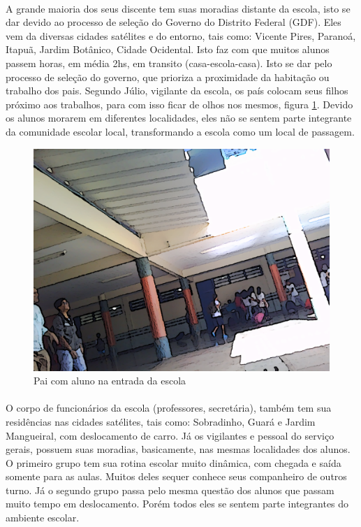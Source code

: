 \paragraph{}A  grande  maioria  dos  seus  discente  tem  suas  moradias  distante  da  escola,  isto  se dar  devido  ao  processo  de  seleção  do  Governo  do  Distrito  Federal  (GDF).  Eles  vem  da diversas  cidades  satélites  e  do  entorno,  tais  como:  Vicente  Pires,  Paranoá,  Itapuã,  Jardim Botânico,  Cidade   Ocidental.   Isto  faz  com  que  muitos  alunos  passem   horas,  em  média   2hs, em  transito  (casa-escola-casa).  Isto  se  dar  pelo  processo  de  seleção  do  governo,  que prioriza  a  proximidade  da  habitação  ou  trabalho  dos  pais.  Segundo  Júlio,  vigilante  da escola,  os  país  colocam  seus  filhos próximo aos trabalhos, para com  isso ficar de olhos nos mesmos, figura \ref{figura06}.  Devido  os  alunos  morarem  em  diferentes  localidades,  eles  não  se sentem  parte  integrante  da  comunidade  escolar  local,  transformando  a  escola  como  um local de passagem.
\begin{figure}[!htpb]
        \centering
        \includegraphics[width=.7\textwidth]{imagens/paiealunoEntrada01.png}
        \caption{Pai com aluno na entrada da escola}
        \label{figura06}
\end{figure}
\paragraph{}O  corpo  de  funcionários  da  escola  (professores,  secretária),  também  tem  sua residências  nas  cidades  satélites,  tais  como:  Sobradinho,  Guará  e  Jardim  Mangueiral,  com deslocamento de carro.  Já  os  vigilantes  e  pessoal  do  serviço  gerais,  possuem  suas moradias,  basicamente,   nas  mesmas   localidades  dos  alunos.  O  primeiro  grupo  tem  sua rotina  escolar  muito  dinâmica,  com  chegada  e   saída  somente  para  as  aulas.   Muitos  deles sequer  conhece  seus  companheiro  de  outros  turno. Já o segundo grupo passa pelo mesma questão  dos  alunos  que  passam  muito  tempo  em  deslocamento.  Porém  todos  eles  se sentem parte integrantes do ambiente escolar.